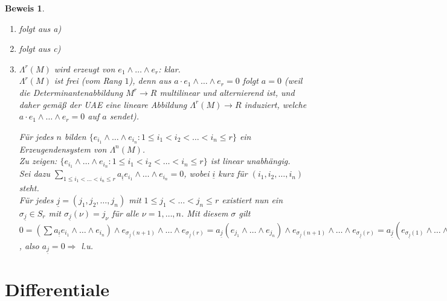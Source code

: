 \documentclass[a4paper,12pt]{scrbook}
\theoremstyle{break}
\theoremstyle{nonumberbreak}
\newtheorem{Bew}{Beweis}
\theoremstyle{nonumberplain}
\begin{document}
\begin{Bew}
  \begin{enumerate}
  \item[b)] folgt aus a)
  \item[d)] folgt aus c)
  \item[c)] $\Lambda^r(M)$ wird erzeugt von $e_1 \wedge \dots \wedge e_r$: klar.\\
    $\Lambda^r(M)$ ist frei (vom Rang $1$), denn aus $a \cdot e_1 \wedge \dots \wedge e_r = 0$
    folgt $a=0$ (weil die Determinantenabbildung $M^r \to R$ multilinear und alternierend ist,
    und daher gemäß der UAE eine lineare Abbildung $\Lambda^r\left(M\right) \to R$ induziert,
    welche $a \cdot e_1 \wedge \dots \wedge e_r = 0$ auf $a$ sendet).

    Für jedes $n$ bilden  $\{e_{i_1} \wedge \dots \wedge e_{i_n}: 1 \leq i_1 < i_2 < \dots < i_n \leq r \}$
    ein Erzeugendensystem von $\Lambda^n\left(M\right)$.\\
    Zu zeigen: $\{e_{i_1} \wedge \dots \wedge e_{i_n}: 1 \leq i_1 < i_2 < \dots < i_n \leq r \}$ ist linear unabhängig.\\
    Sei dazu $\sum_{1 \leq i_1 < \dots < i_n \leq r} a_{\underline{i}}e_{i_1} \wedge \dots \wedge e_{i_n} = 0$,
    wobei $\underline{i}$ kurz für $\left(i_1,i_2,\dots ,i_n\right)$ steht.\\
    Für jedes $\underline{j} = (j_1, j_2, \dots, j_n)$ mit $1 \leq j_1 < \dots < j_n \leq r$ existiert nun ein
    $\sigma_{\underline{j}} \in S_r$ mit $\sigma_{\underline{j}}(\nu) = j_{\nu}$ für alle $\nu = 1, \dots ,n$. Mit diesem $\sigma$ gilt
    $ 0= (\sum a_{\underline{i}} e_{i_1} \wedge \dots \wedge e_{i_n}) \wedge 
    e_{\sigma_{\underline{j}}\left(n+1\right)}  \wedge \dots \wedge e_{\sigma_{\underline{j}}\left(r\right)} 
    = a_{\underline{j}} (e_{j_1} \wedge \dots \wedge e_{j_n}) \wedge e_{\sigma_{\underline{j}}\left(n+1\right)}  \wedge \dots \wedge e_{\sigma_{\underline{j}}\left(r\right)} 
    = a_{\underline{j}} (e_{\sigma_{\underline{j}}\left(1\right)} \wedge \dots \wedge e_{\sigma_{\underline{j}}\left(n\right)}) \wedge e_{\sigma_{\underline{j}}\left(n+1\right)}  \wedge \dots \wedge e_{\sigma_{\underline{j}}\left(r\right) } 
    = \left(-1\right)^{\sigma_{\underline{j}}} a_{\underline{j}} e_1 \wedge \dots \wedge e_r$, also
    $a_{\underline{j}} = 0 \Rightarrow$ l.u. 
  \end{enumerate}
\end{Bew}
\section{Differentiale}
\end{document}
